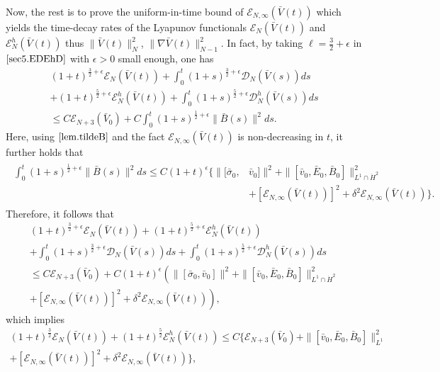 \documentclass[11pt]{amsart}
\numberwithin{equation}{section}
\begin{document}
Now, the rest is to prove the uniform-in-time bound of $\mathcal
 {E}_{N,\infty}(\bar{V}(t))$ which yields the time-decay rates of the
 Lyapunov functionals $\mathcal
 {E}_{N}(\bar{V}(t))$ and $\mathcal
 {E}_{N}^h(\bar{V}(t))$ thus $\|\bar{V}(t)\|_{N}^{2}$, $\|\nabla\bar{V}(t)\|_{N-1}^{2}$.
In fact, by taking $\ell =\frac{3}{2}+\epsilon$ in
$\eqref{sec5.EDEhD}$ with $\epsilon>0$ small enough, one has
\begin{multline*}
(1+t)^{\frac{3}{2}+\epsilon}\mathcal {E}_{N}(\bar{V}(t))+
 \int_{0}^{t}(1+s)^{\frac{3}{2}+\epsilon}\mathcal {D}_{N}(\bar{V}(s))d s\\
 +(1+t)^{\frac{5}{2}+\epsilon}\mathcal
{E}_{N}^h(\bar{V}(t))+
 \int_{0}^{t}(1+s)^{\frac{5}{2}+\epsilon}\mathcal {D}_{N}^h(\bar{V}(s))d s \\
 \leq  C \mathcal {E}_{N+3}(\bar{V}_{0})+ C \int_{0}^{t}(1+s)^{\frac{1}{2}+\epsilon}\|
  \bar{B}(s)\|^{2}d s.
\end{multline*}
Here, using $\eqref{lem.tildeB}$ and the fact $\mathcal
 {E}_{N,\infty}(\bar{V}(t))$ is non-decreasing in $t$, it further holds
 that
\begin{eqnarray*}
\begin{aligned}
 \int_{0}^{t}(1+s)^{\frac{1}{2}+\epsilon}\|
  \bar{B}(s)\|^{2}d s\leq
  C(1+t)^{\epsilon}\Big\{\|[\bar{\sigma}_{0},&\bar{v}_{0}]\|^{2}+
 \|[\bar{v}_{0},\bar{E}_{0},\bar{B}_{0}]\|^2_{L^1\cap \dot{H}^{2}}\\
 &+[\mathcal
{E}_{N,\infty}(\bar{V}(t))]^2 +\delta ^2 \mathcal
{E}_{N,\infty}(\bar{V}(t))\Big\}.
\end{aligned}
\end{eqnarray*}
Therefore, it follows that
\begin{multline*}
(1+t)^{\frac{3}{2}+\epsilon}\mathcal
{E}_{N}(\bar{V}(t))+(1+t)^{\frac{5}{2}+\epsilon}\mathcal
{E}_{N}^h(\bar{V}(t))\\
+ \int_{0}^{t}(1+s)^{\frac{3}{2}+\epsilon}\mathcal
{D}_{N}(\bar{V}(s))d s
 + \int_{0}^{t}(1+s)^{\frac{5}{2}+\epsilon}\mathcal {D}_{N}^h(\bar{V}(s))d s \\
 \leq  C \mathcal {E}_{N+3}(\bar{V}_{0})+ C (1+t)^{\epsilon}\left(\|[\bar{\sigma}_{0},\bar{v}_{0}]\|^{2}+
 \|[\bar{v}_{0},\bar{E}_{0},\bar{B}_{0}]\|^2_{L^1\cap \dot{H}^{2}}\right.\\
 \left.+[\mathcal
{E}_{N,\infty}(\bar{V}(t))]^2 +\delta^2 \mathcal
{E}_{N,\infty}(\bar{V}(t))\right),
\end{multline*}
which implies
\begin{multline*}
(1+t)^{\frac{3}{2}}\mathcal
{E}_{N}(\bar{V}(t))+(1+t)^{\frac{5}{2}}\mathcal
{E}_{N}^h(\bar{V}(t))
 \leq  C \Big\{ \mathcal {E}_{N+3}(\bar{V}_{0})+
\|[\bar{v}_{0},\bar{E}_{0},\bar{B}_{0}]\|^2_{L^1}\\
 +[\mathcal
{E}_{N,\infty}(\bar{V}(t))]^2 +\delta ^2 \mathcal
{E}_{N,\infty}(\bar{V}(t))\Big\},
\end{multline*}
\end{document}
